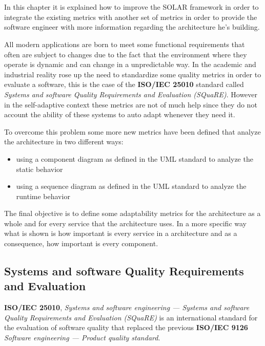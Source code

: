 \chapter{}
\label{cap:}
In this chapter it is explained how to improve the SOLAR framework in order to integrate the existing metrics with another set of metrics in order to provide the software engineer with more information regarding the architecture he's building. 

All modern applications are born to meet some functional requirements that often are subject to changes due to the fact that the environment where they operate is dynamic and can change in a unpredictable way. In the academic and industrial reality rose up the need to standardize some quality metrics in order to evaluate a software, this is the case of the \textbf{ISO/IEC 25010} standard called \emph{Systems and software Quality Requirements and Evaluation (SQuaRE)}\cite{iso/iec-25010}. However in the self-adaptive context these metrics are not of much help since they do not account the ability of these systems to auto adapt whenever they need it.

To overcome this problem some more new metrics have been defined that analyze the architecture in two different ways:
\begin{itemize}
	\item using a component diagram as defined in the UML standard\cite{uml} to analyze the static behavior
	\item using a sequence diagram as defined in the UML standard\cite{uml} to analyze the runtime behavior
\end{itemize}

The final objective is to define some adaptability metrics for the architecture as a whole and for every service that the architecture uses. In a more specific way what is shown is how important is every service in a architecture and as a consequence, how important is every component.

\section{Systems and software Quality Requirements and Evaluation}
\label{sec:square}
\textbf{ISO/IEC 25010}, \emph{Systems and software engineering — Systems and software Quality Requirements and Evaluation (SQuaRE)}\cite{iso/iec-25010} is an international standard for the evaluation of software quality that replaced the previous \textbf{ISO/IEC 9126} \emph{Software engineering — Product quality standard}\cite{iso/iec-9126}.

